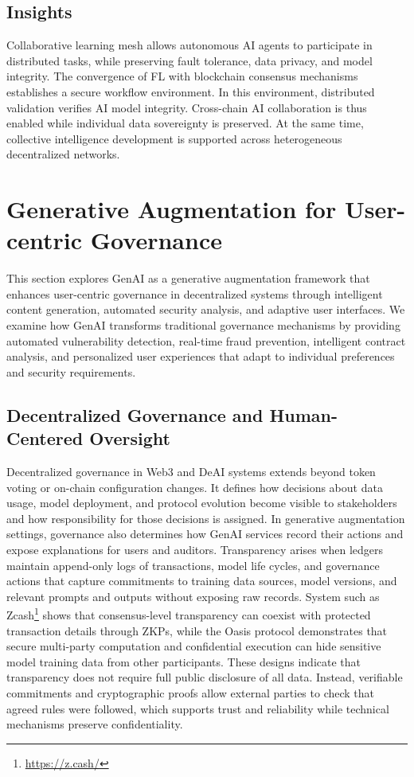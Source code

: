 \documentclass[5p,twocolumn]{elsarticle}
\begin{document}
\subsection{Insights}
Collaborative learning mesh allows autonomous AI agents to participate in distributed tasks, while preserving fault tolerance, data privacy, and model integrity. The convergence of FL with blockchain consensus mechanisms establishes a secure workflow environment. In this environment, distributed validation verifies AI model integrity. Cross-chain AI collaboration is thus enabled while individual data sovereignty is preserved. At the same time, collective intelligence development is supported across heterogeneous decentralized networks.

\section{Generative Augmentation for User-centric Governance} \label{sec:genai}
This section explores GenAI as a generative augmentation framework that enhances user-centric governance in decentralized systems through intelligent content generation, automated security analysis, and adaptive user interfaces. We examine how GenAI transforms traditional governance mechanisms by providing automated vulnerability detection, real-time fraud prevention, intelligent contract analysis, and personalized user experiences that adapt to individual preferences and security requirements.


	
\subsection{Decentralized Governance and Human-Centered Oversight}
Decentralized governance in Web3 and DeAI systems extends beyond token voting or on-chain configuration changes. It defines how decisions about data usage, model deployment, and protocol evolution become visible to stakeholders and how responsibility for those decisions is assigned. In generative augmentation settings, governance also determines how GenAI services record their actions and expose explanations for users and auditors. Transparency arises when ledgers maintain append-only logs of transactions, model life cycles, and governance actions that capture commitments to training data sources, model versions, and relevant prompts and outputs without exposing raw records. System such as Zcash\footnote{\url{https://z.cash/}} shows that consensus-level transparency can coexist with protected transaction details through ZKPs, while the Oasis protocol demonstrates that secure multi-party computation and confidential execution can hide sensitive model training data from other participants. These designs indicate that transparency does not require full public disclosure of all data. Instead, verifiable commitments and cryptographic proofs allow external parties to check that agreed rules were followed, which supports trust and reliability while technical mechanisms preserve confidentiality.
\end{document}
